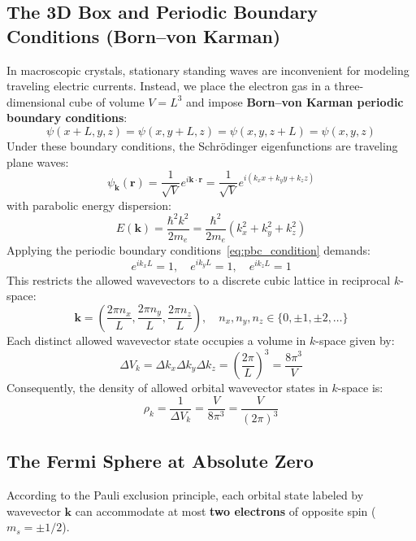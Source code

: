 \documentclass[11pt,a4paper]{article}
\newcommand{\vb}[1]{\mathbf{#1}}
\begin{document}
\subsection{The 3D Box and Periodic Boundary Conditions (Born--von Karman)}
In macroscopic crystals, stationary standing waves are inconvenient for modeling traveling electric currents. Instead, we place the electron gas in a three-dimensional cube of volume $V = L^3$ and impose \textbf{Born--von Karman periodic boundary conditions}:
\begin{equation}
\psi(x+L, y, z) = \psi(x, y+L, z) = \psi(x, y, z+L) = \psi(x, y, z)
\label{eq:pbc_condition}
\end{equation}
Under these boundary conditions, the Schrödinger eigenfunctions are traveling plane waves:
\begin{equation}
\psi_{\vb{k}}(\vb{r}) = \frac{1}{\sqrt{V}}e^{i\vb{k}\cdot\vb{r}} = \frac{1}{\sqrt{V}}e^{i(k_x x + k_y y + k_z z)}
\label{eq:plane_wave}
\end{equation}
with parabolic energy dispersion:
\begin{equation}
E(\vb{k}) = \frac{\hbar^2 k^2}{2m_e} = \frac{\hbar^2}{2m_e}(k_x^2 + k_y^2 + k_z^2)
\label{eq:3d_dispersion}
\end{equation}
Applying the periodic boundary conditions~\eqref{eq:pbc_condition} demands:
\begin{equation}
e^{i k_x L} = 1, \quad e^{i k_y L} = 1, \quad e^{i k_z L} = 1
\end{equation}
This restricts the allowed wavevectors to a discrete cubic lattice in reciprocal $k$-space:
\begin{equation}
\vb{k} = \left(\frac{2\pi n_x}{L}, \frac{2\pi n_y}{L}, \frac{2\pi n_z}{L}\right), \quad n_x, n_y, n_z \in \{0, \pm 1, \pm 2, \dots\}
\label{eq:k_quantization}
\end{equation}
Each distinct allowed wavevector state occupies a volume in $k$-space given by:
\begin{equation}
\Delta V_k = \Delta k_x \Delta k_y \Delta k_z = \left(\frac{2\pi}{L}\right)^3 = \frac{8\pi^3}{V}
\label{eq:k_cell_volume}
\end{equation}
Consequently, the density of allowed orbital wavevector states in $k$-space is:
\begin{equation}
\rho_k = \frac{1}{\Delta V_k} = \frac{V}{8\pi^3} = \frac{V}{(2\pi)^3}
\label{eq:k_state_density}
\end{equation}

\subsection{The Fermi Sphere at Absolute Zero}
According to the Pauli exclusion principle, each orbital state labeled by wavevector $\vb{k}$ can accommodate at most \textbf{two electrons} of opposite spin ($m_s = \pm 1/2$).
\end{document}
